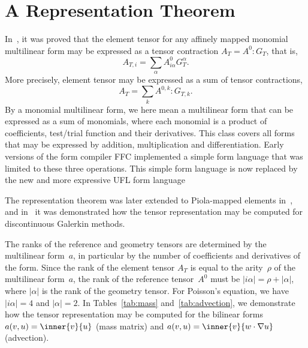 \section{A Representation Theorem}

In~\cite{KirbyLogg2006}, it was proved that the element tensor for any
affinely mapped monomial multilinear form may be expressed as a tensor
contraction $A_T = A^0 : G_T$, that is,
\begin{equation*}
  A_{T,i} = \sum_{\alpha} A^0_{i\alpha} G_T^{\alpha}.
\end{equation*}
More precisely, element tensor may be expressed as a sum of tensor
contractions,
\begin{equation} \label{eq:tensorcontraction}
  A_T = \sum_k A^{0,k} : G_{T,k}.
\end{equation}
By a monomial multilinear form, we here mean a multilinear form that
can be expressed as a sum of monomials, where each monomial is a
product of coefficients, test/trial function and their derivatives.
This class covers all forms that may be expressed by addition,
multiplication and differentiation. Early versions of the form
compiler FFC implemented a simple form language that was limited to
these three operations. This simple form language is now replaced by
the new and more expressive UFL form language

The representation theorem was later extended to Piola-mapped elements
in~\cite{RognesKirbyEtAl2008}, and in~\cite{OlgaardLoggEtAl2008} it was
demonstrated how the tensor representation may be computed for
discontinuous Galerkin methods.

The ranks of the reference and geometry tensors are determined by the
multilinear form~$a$, in particular by the number of coefficients and
derivatives of the form. Since the rank of the element tensor $A_T$ is
equal to the arity~$\rho$ of the multilinear form~$a$, the rank of the
reference tensor~$A^0$ must be $|i\alpha| = \rho + |\alpha|$, where
$|\alpha|$ is the rank of the geometry tensor. For Poisson's equation,
we have $|i\alpha| = 4$ and $|\alpha| = 2$. In Tables~\ref{tab:mass}
and~\ref{tab:advection}, we demonstrate how the tensor representation
may be computed for the bilinear forms $a(v, u) = \inner{v}{u}$ (mass
matrix) and $a(v, u) = \inner{v}{w \cdot \nabla u}$ (advection).

